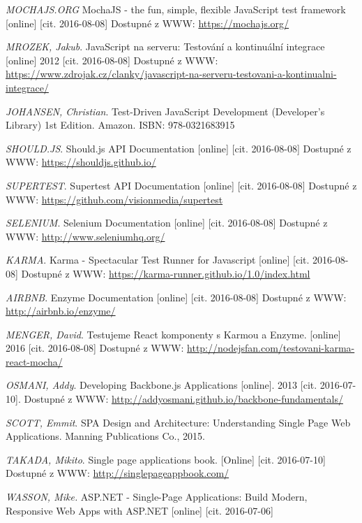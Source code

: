 \begin{thebibliography}{10}
 \textit{MOCHAJS.ORG} MochaJS -  the fun, simple, flexible JavaScript test framework [online] [cit. 2016-08-08] Dostupné z WWW: \url{https://mochajs.org/}

 \textit{MROZEK, Jakub}. JavaScript na serveru: Testování a kontinuální integrace [online] 2012 [cit. 2016-08-08] Dostupné z WWW: \url{https://www.zdrojak.cz/clanky/javascript-na-serveru-testovani-a-kontinualni-integrace/}

 \textit{JOHANSEN, Christian}. Test-Driven JavaScript Development (Developer's Library) 1st Edition. Amazon. ISBN: 978-0321683915

\textit{SHOULD.JS}. Should.js API Documentation [online] [cit. 2016-08-08] Dostupné z WWW: \url{https://shouldjs.github.io/}

\textit{SUPERTEST}. Supertest API Documentation [online] [cit. 2016-08-08] Dostupné z WWW: \url{https://github.com/visionmedia/supertest}

\textit{SELENIUM}. Selenium Documentation [online] [cit. 2016-08-08] Dostupné z WWW: \url{http://www.seleniumhq.org/}

 \textit{KARMA}. Karma - Spectacular Test Runner for Javascript [online] [cit. 2016-08-08] Dostupné z WWW: \url{https://karma-runner.github.io/1.0/index.html}

 \textit{AIRBNB}. Enzyme Documentation [online] [cit. 2016-08-08] Dostupné z WWW: \url{http://airbnb.io/enzyme/}

 \textit{MENGER, David}. Testujeme React komponenty s Karmou a Enzyme. [online] 2016 [cit. 2016-08-08] Dostupné z WWW: \url{http://nodejsfan.com/testovani-karma-react-mocha/}

 \textit{OSMANI, Addy}. Developing Backbone.js Applications [online]. 2013 [cit. 2016-07-10]. Dostupné z WWW: \url{http://addyosmani.github.io/backbone-fundamentals/}

 \textit{SCOTT, Emmit}. SPA Design and Architecture: Understanding Single Page Web Applications. Manning Publications Co., 2015.

 \textit{TAKADA, Mikito}. Single page applications book. [Online] [cit. 2016-07-10] Dostupné z WWW: \url{http://singlepageappbook.com/}

 \textit{WASSON, Mike.} ASP.NET - Single-Page Applications: Build Modern, Responsive Web Apps with ASP.NET [online] [cit. 2016-07-06] 


\end{thebibliography}
